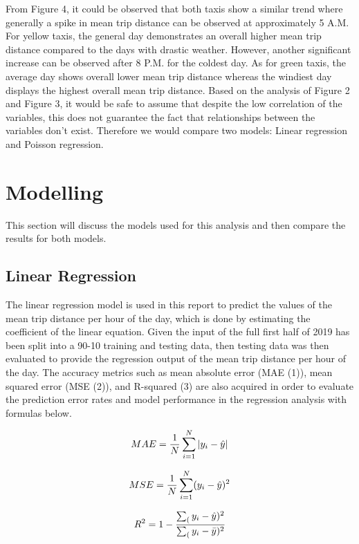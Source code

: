 \documentclass[11pt]{article}
\begin{document}
From Figure 4, it could be observed that both taxis show a similar trend where generally a spike in mean trip distance can be observed at approximately 5 A.M. For yellow taxis, the general day demonstrates an overall higher mean trip distance compared to the days with drastic weather. However, another significant increase can be observed after 8 P.M. for the coldest day. As for green taxis, the average day shows overall lower mean trip distance whereas the windiest day displays the highest overall mean trip distance. Based on the analysis of Figure 2 and Figure 3, it would be safe to assume that despite the low correlation of the variables, this does not guarantee the fact that relationships between the variables don't exist. Therefore we would compare two models: Linear regression and Poisson regression. 

\section{Modelling}
This section will discuss the models used for this analysis and then compare the results for both models.
\subsection{Linear Regression}
The linear regression model is used in this report to predict the values of the mean trip distance per hour of the day, which is done by estimating the coefficient of the linear equation. Given the input of the full first half of 2019 has been split into a 90-10 training and testing data, then testing data was then evaluated to provide the regression output of the mean trip distance per hour of the day. The accuracy metrics such as mean absolute error (MAE (1)), mean squared error (MSE (2)), and R-squared (3) are also acquired in order to evaluate the prediction error rates and model performance in the regression analysis with formulas below.

\begin{equation}
  \centering
  MAE = \frac{1}{N}\sum_{i=1}^{N}|y_i-\hat{y}|  
\end{equation}

\begin{equation}
  \centering
  MSE = \frac{1}{N}\sum_{i=1}^{N}(y_i-\hat{y})^2
\end{equation}

\begin{equation}
  \centering
  R^2 = 1 - \frac{\sum_(y_i-\hat{y})^2}{\sum_(y_i-\bar{y})^2}
\end{equation}
\end{document}
